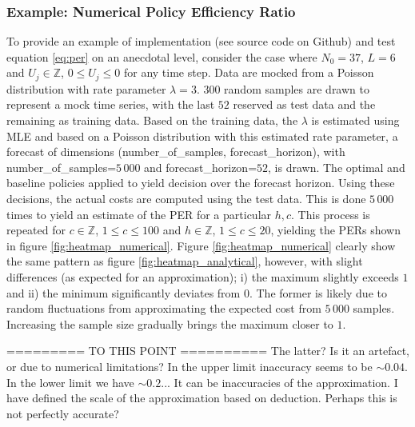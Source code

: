 \documentclass[a4paper,12pt]{article}
\begin{document}
	
	
	
	
	
	\subsubsection{Example: Numerical Policy Efficiency Ratio}
	To provide an example of implementation (see source code on Github) and test equation \eqref{eq:per} on an anecdotal level, consider the case where $N_0=37$, $L =6$ and $U_j\in \mathbb{Z}$, $0\leq U_j\leq 0$ for any time step. Data are mocked from a Poisson distribution with rate parameter $\lambda =3$. $300$ random samples are drawn to represent a mock time series, with the last $52$ reserved as test data and the remaining as training data. Based on the training data, the $\lambda$ is estimated using MLE and based on a Poisson distribution with this estimated rate parameter, a forecast of dimensions (number\_of\_samples, forecast\_horizon), with number\_of\_samples=$5\,000$ and forecast\_horizon=$52$, is drawn. The optimal and baseline policies applied to yield decision over the forecast horizon. Using these decisions, the actual costs are computed using the test data. This is done $5\,000$ times to yield an estimate of the PER for a particular $h,c$. This process is repeated for $c\in \mathbb{Z}$, $1\leq c\leq 100$ and $h\in \mathbb{Z}$, $1\leq c\leq 20$, yielding the PERs shown in figure \ref{fig:heatmap_numerical}. Figure \ref{fig:heatmap_numerical} clearly show the same pattern as figure \ref{fig:heatmap_analytical}, however, with slight differences (as expected for an approximation); i) the maximum slightly exceeds $1$ and ii) the minimum significantly deviates from $0$. The former is likely due to random fluctuations from approximating the expected cost from $5\, 000$ samples. Increasing the sample size gradually brings the maximum closer to $1$. 
	
	========= TO THIS POINT ==========
	{\color{red} The latter? Is it an artefact, or due to numerical limitations? In the upper limit inaccuracy seems to be $\sim 0.04$. In the lower limit we have $\sim 0.2$... It can be inaccuracies of the approximation. I have defined the scale of the approximation based on deduction. Perhaps this is not perfectly accurate?}
	
\end{document}
